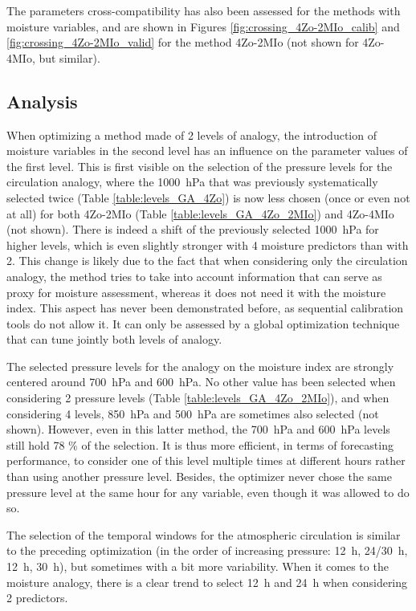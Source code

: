 \documentclass[5p]{elsarticle}
\begin{document}
The parameters cross-compatibility has also been assessed for the methods with moisture variables, and are shown in Figures \ref{fig:crossing_4Zo-2MIo_calib} and \ref{fig:crossing_4Zo-2MIo_valid} for the method 4Zo-2MIo (not shown for 4Zo-4MIo, but similar).


\subsection{Analysis}

When optimizing a method made of 2 levels of analogy, the introduction of moisture variables in the second level has an influence on the parameter values of the first level. This is first visible on the selection of the pressure levels for the circulation analogy, where the 1000~hPa that was previously systematically selected twice (Table \ref{table:levels_GA_4Zo}) is now less chosen (once or even not at all) for both 4Zo-2MIo (Table \ref{table:levels_GA_4Zo_2MIo}) and 4Zo-4MIo (not shown). There is indeed a shift of the previously selected 1000~hPa for higher levels, which is even slightly stronger with 4 moisture predictors than with 2. This change is likely due to the fact that when considering only the circulation analogy, the method tries to take into account information that can serve as proxy for moisture assessment, whereas it does not need it with the moisture index. This aspect has never been demonstrated before, as sequential calibration tools do not allow it. It can only be assessed by a global optimization technique that can tune jointly both levels of analogy. 

The selected pressure levels for the analogy on the moisture index are strongly centered around 700~hPa and 600~hPa. No other value has been selected when considering 2 pressure levels (Table \ref{table:levels_GA_4Zo_2MIo}), and when considering 4 levels, 850~hPa and 500~hPa are sometimes also selected (not shown). However, even in this latter method, the 700~hPa and 600~hPa levels still hold 78 \% of the selection. It is thus more efficient, in terms of forecasting performance, to consider one of this level multiple times at different hours rather than using another pressure level. Besides, the optimizer never chose the same pressure level at the same hour for any variable, even though it was allowed to do so.

The selection of the temporal windows for the atmospheric circulation is similar to the preceding optimization (in the order of increasing pressure: 12~h, 24/30~h, 12~h, 30~h), but sometimes with a bit more variability. When it comes to the moisture analogy, there is a clear trend to select 12~h and 24~h when considering 2 predictors.
\end{document}
